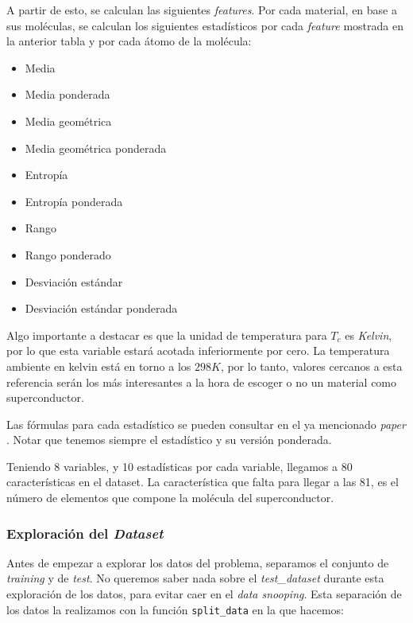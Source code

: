 \documentclass[11pt]{article}
\begin{document}
A partir de esto, se calculan las siguientes \emph{features}. Por cada material, en base a sus moléculas, se calculan los siguientes estadísticos por cada \emph{feature} mostrada en la anterior tabla y por cada átomo de la molécula:


\begin{itemize}
    \item Media
    \item Media ponderada
    \item Media geométrica
    \item Media geométrica ponderada
    \item Entropía
    \item Entropía ponderada
    \item Rango
    \item Rango ponderado
    \item Desviación estándar
    \item Desviación estándar ponderada
\end{itemize}

Algo importante a destacar es que la unidad de temperatura para $T_c$ es \emph{Kelvin}, por lo que esta variable estará acotada inferiormente por cero. La temperatura ambiente en kelvin está en torno a los $298K$, por lo tanto, valores cercanos a esta referencia serán los más interesantes a la hora de escoger o no un material como superconductor.

Las fórmulas para cada estadístico se pueden consultar en el ya mencionado \emph{paper} \cite{original_paper_reg:paper}. Notar que tenemos siempre el estadístico y su versión ponderada.

Teniendo 8 variables, y 10 estadísticas por cada variable, llegamos a 80 características en el dataset. La característica que falta para llegar a las 81, es el número de elementos que compone la molécula del superconductor.

\subsubsection{Exploración del \emph{Dataset}}

Antes de empezar a explorar los datos del problema, separamos el conjunto de \emph{training} y de \emph{test}. No queremos saber nada sobre el \emph{test\_dataset} durante esta exploración de los datos, para evitar caer en el \emph{data snooping}. Esta separación de los datos la realizamos con la función \lstinline{split_data} en la que hacemos:
\end{document}
